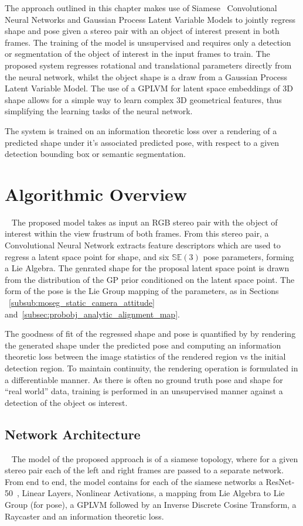 The approach outlined in this chapter makes use of Siamese~\cite{SIAMESE} 
Convolutional Neural Networks and Gaussian Process Latent Variable Models to jointly regress 
shape and pose given a stereo pair with an object of interest present in both frames. The training of the 
model is unsupervised and requires only a detection or segmentation of the object of interest in the input 
frames to train. The proposed system regresses rotational and translational parameters directly 
from the neural network, whilst the object shape is a draw from a Gaussian Process 
Latent Variable Model. The use of a GPLVM for latent space embeddings of 3D shape 
allows for a simple way to learn complex 3D geometrical features, thus simplifying 
the learning tasks of the neural network.

The system is trained on an information theoretic loss over a rendering of a predicted 
shape under it's associated predicted pose, with respect to a given detection bounding box 
or semantic segmentation. 

\section{Algorithmic Overview}
~\label{sec:spp_algorithm}
The proposed model takes as input an RGB stereo pair with the object of interest within the 
view frustrum of both frames. From this stereo pair, a Convolutional Neural Network extracts 
feature descriptors which are used to regress a latent space point for shape, and six 
\( \mathbb{SE}(3) \) pose parameters, forming a Lie Algebra. The genrated shape for the proposal 
latent space point is drawn from the distribution of the GP prior conditioned on the latent space 
point. The form of the pose is the Lie Group mapping of the parameters, as in Sections
~\ref{subsub:moseg_static_camera_attitude} and~\ref{subsec:probobj_analytic_alignment_map}. 

The goodness of fit of the regressed shape and pose is quantified by by rendering the generated shape 
under the predicted pose and computing an information theoretic loss between the image statistics of 
the rendered region vs the initial detection region. To maintain continuity, the rendering operation is 
formulated in a differentiable manner. As there is often no ground truth pose and shape for ``real world'' 
data, training is performed in an unsupervised manner against a detection of the object os interest.

\subsection{Network Architecture}
~\label{subsec:spp_network_architecture}
The model of the proposed approach is of a siamese topology, where for a given stereo 
pair each of the left and right frames are passed to a separate network. From end to 
end, the model contains for each of the siamese networks a ResNet-50~\cite{He2015}, 
Linear Layers, Nonlinear Activations, a mapping from Lie Algebra to Lie Group (for pose),
a GPLVM followed by an Inverse Discrete Cosine Transform, a Raycaster and an information 
theoretic loss. 

